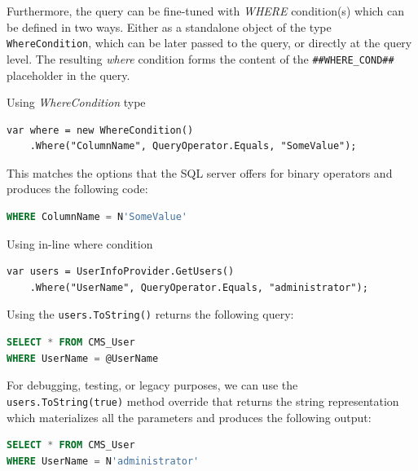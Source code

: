 \documentclass[
  print,
  table,
  nolof,
  nolot,
  nocover,
  oneside
]{fithesis3}
\begin{document}
Furthermore, the query can be fine-tuned with \textit{WHERE} condition(s) which can be defined in two ways. Either as a standalone object of the type \texttt{WhereCondition}, which can be later passed to the query, or directly at the query level. The resulting \textit{where} condition forms the content of the \texttt{\#\#WHERE\_COND\#\#} placeholder in the query.

\begin{compactenum}
  \item Using \textit{WhereCondition} type
    \begin{lstlisting}
var where = new WhereCondition()
    .Where("ColumnName", QueryOperator.Equals, "SomeValue");
    \end{lstlisting}
    This matches the options that the SQL server offers for binary operators and produces the following code:
    \begin{lstlisting}[language=SQL,escapechar=@,language=SQL,basicstyle=\ttfamily]
WHERE ColumnName = N'SomeValue'
    \end{lstlisting}
  \item Using in-line where condition
    \begin{lstlisting}
var users = UserInfoProvider.GetUsers()
    .Where("UserName", QueryOperator.Equals, "administrator");
    \end{lstlisting}
    Using the \texttt{users.ToString()} returns the following query:
    \begin{lstlisting}[language=SQL,language=SQL,basicstyle=\ttfamily]
SELECT * FROM CMS_User
WHERE UserName = @UserName
    \end{lstlisting}
    For debugging, testing, or legacy purposes, we can use the \texttt{users.ToString(true)} method override that returns the string representation which materializes all the parameters and produces the following output:
    \begin{lstlisting}[language=SQL,escapechar=@,language=SQL,basicstyle=\ttfamily]
SELECT * FROM CMS_User
WHERE UserName = N'administrator'
    \end{lstlisting}
\end{compactenum}
\end{document}
